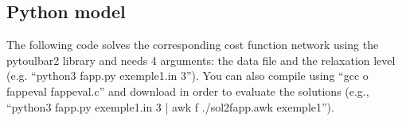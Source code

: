 \documentclass[letterpaper,10pt,openany,oneside,english]{sphinxmanual}
\begin{document}
\subsection{Python model}
\label{\detokenize{examples/tuto_fapwp:python-model}}
\sphinxAtStartPar
The following code solves the corresponding cost function network using the pytoulbar2 library and needs 4 arguments: the data file and the relaxation level (e.g. “python3 fapp.py exemple1.in 3”). You can also compile  using “gcc \sphinxhyphen{}o fappeval fappeval.c” and download  in order to evaluate the solutions (e.g., “python3 fapp.py exemple1.in 3 | awk \sphinxhyphen{}f ./sol2fapp.awk \sphinxhyphen{} exemple1”).

\sphinxAtStartPar
{}
\end{document}
